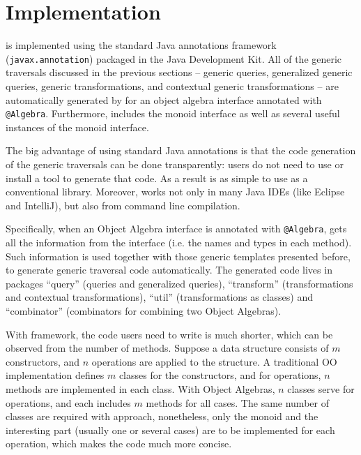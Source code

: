 \section{\name Implementation}

\name is implemented using the standard Java annotations framework
(\lstinline{javax.annotation}) packaged in the Java Development Kit.
All of the generic traversals discussed in the previous sections --
generic queries, generalized generic queries, generic transformations,
and contextual generic transformations -- are automatically generated
by \name for an object algebra interface annotated with \lstinline{@Algebra}.
Furthermore, \name includes the monoid interface as well as several
useful instances of the monoid interface.

The big advantage of using standard Java annotations is that the code generation of the generic traversals can be done transparently: users do not need to use or install a tool to generate that code. As a result \name is as simple to use as a conventional library. Moreover, \name works not only in many Java IDEs (like Eclipse and IntelliJ), but also from command line compilation.

Specifically, when an Object Algebra interface is annotated with \lstinline{@Algebra}, \name gets all the information from the interface (i.e. the names and types in each method). Such information is used together with those generic templates presented before, to generate generic traversal code automatically. The generated code lives in packages ``query'' (queries and generalized queries), ``transform'' (transformations and contextual transformations), ``util'' (transformations as classes) and ``combinator'' (combinators for combining two Object Algebras).

With \name framework, the code users need to write is much shorter, which can be observed from the number of methods. Suppose a data structure consists of $m$ constructors, and $n$ operations are applied to the structure. A traditional OO implementation defines $m$ classes for the constructors, and for operations, $n$ methods are implemented in each class. With Object Algebras, $n$ classes serve for operations, and each includes $m$ methods for all cases. The same number of classes are required with \name approach, nonetheless, only the monoid and the interesting part (usually one or several cases) are to be implemented for each operation, which makes the code much more concise.

